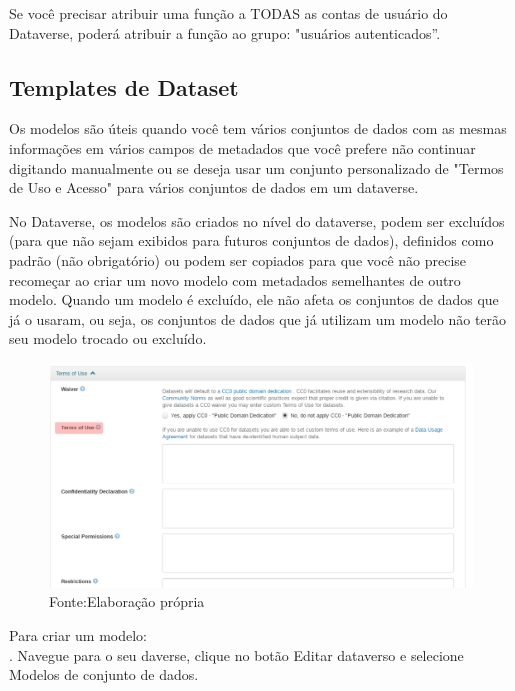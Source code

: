 \documentclass[12pt,hidelinks]{article}
\begin{document}
Se você precisar atribuir uma função a TODAS as contas de usuário do Dataverse, poderá atribuir a função ao grupo: "usuários autenticados”.
        
    \subsection{Templates de Dataset}
    
\qquad Os modelos são úteis quando você tem vários conjuntos de dados com as mesmas informações em vários campos de metadados que você prefere não continuar \\digitando manualmente ou se deseja usar um conjunto personalizado de "Termos de Uso e Acesso" para vários conjuntos de dados em um dataverse. 

No Dataverse, os modelos são criados no nível do dataverse, podem ser excluídos (para que não sejam exibidos para futuros conjuntos de dados), definidos como padrão (não obrigatório) ou podem ser copiados para que você não precise recomeçar ao criar um novo modelo com metadados semelhantes de outro modelo. Quando um modelo é excluído, ele não afeta os conjuntos de dados que já o usaram, ou seja, os conjuntos de dados que já utilizam um modelo não terão seu modelo trocado ou excluído.\\

 \begin{figure}[H]
\centering
    \includegraphics[width=1.0\textwidth]{Prints/pn1.png}
    \caption{Fonte:Elaboração própria}
    \label{print6}
\end{figure}

Para criar um modelo:\\

. Navegue para o seu daverse, clique no botão Editar dataverso e selecione Modelos de conjunto de dados.\\
\end{document}
